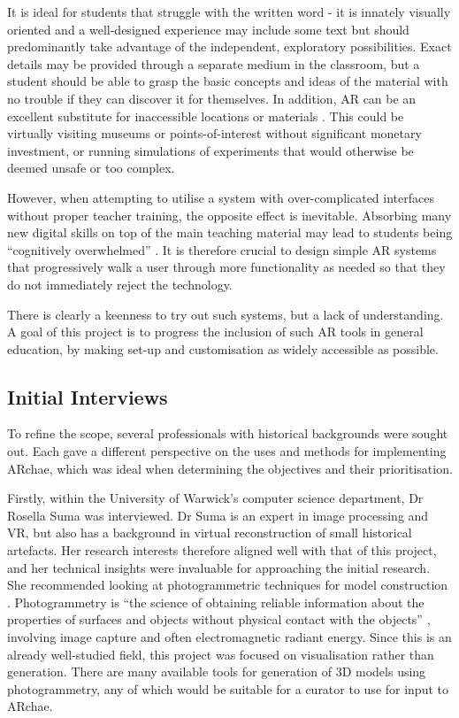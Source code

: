 \documentclass[12pt, a4paper]{article}
\begin{document}
It is ideal for students that struggle with the written word \cite{education:class} - it is innately visually oriented and a well-designed experience may include some text but should predominantly take advantage of the independent, exploratory possibilities. Exact details may be provided through a separate medium in the classroom, but a student should be able to grasp the basic concepts and ideas of the material with no trouble if they can discover it for themselves. In addition, AR can be an excellent substitute for inaccessible locations or materials \cite{education:placespotentials}. This could be virtually visiting museums or points-of-interest without significant monetary investment, or running simulations of experiments that would otherwise be deemed unsafe or too complex.

However, when attempting to utilise a system with over-complicated interfaces without proper teacher training, the opposite effect is inevitable. Absorbing many new digital skills on top of the main teaching material may lead to students being “cognitively overwhelmed” \cite{education:overwhelm}. It is therefore crucial to design simple AR systems that progressively walk a user through more functionality as needed so that they do not immediately reject the technology. 

There is clearly a keenness to try out such systems, but a lack of understanding. A goal of this project is to progress the inclusion of such AR tools in general education, by making set-up and customisation as widely accessible as possible. 

\subsection{Initial Interviews}
To refine the scope, several professionals with historical backgrounds were sought out. Each gave a different perspective on the uses and methods for implementing ARchae, which was ideal when determining the objectives and their prioritisation.

Firstly, within the University of Warwick's computer science department, Dr Rosella Suma was interviewed. Dr Suma is an expert in image processing and VR, but also has a background in virtual reconstruction of small historical artefacts. Her research interests therefore aligned well with that of this project, and her technical insights were invaluable for approaching the initial research. She recommended looking at photogrammetric techniques for model construction \cite{interviews:rosellapaper}. Photogrammetry is ``the science of obtaining reliable information about the
properties of surfaces and objects without physical contact with the objects'' \cite{interviews:photogrammetry}, involving image capture and often electromagnetic radiant energy. Since this is an already well-studied field, this project was focused on visualisation rather than generation. There are many available tools for generation of 3D models using photogrammetry, any of which would be suitable for a curator to use for input to ARchae.
\end{document}
